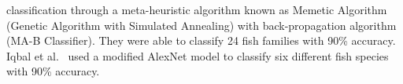 \documentclass[conference]{IEEEtran}
\begin{document}
classification through a meta-heuristic algorithm known as Memetic Algorithm (Genetic Algorithm with Simulated Annealing) with back-propagation algorithm (MA-B Classifier). They were able to classify 24 fish families with 90\%
accuracy.
Iqbal et al.~\cite{Iqbal2021AutomaticFS} used a modified
AlexNet \cite{AlexNet2012} model to classify six different fish species
with 90\% accuracy.
\end{document}
